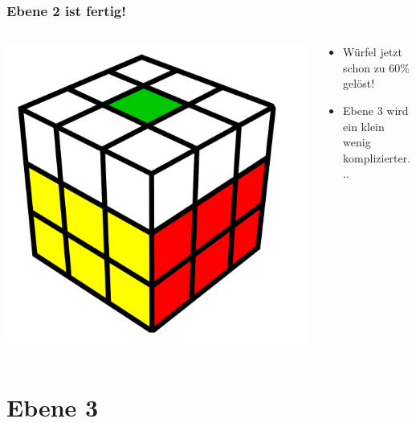 \begin{frame}
	\frametitle{Ebene 2 ist fertig!}
	
	\begin{columns}[c]
		\begin{column}[C]{.5\textwidth}
			\center
			\includegraphics[scale=0.3]{img/layer2edge4}
		\end{column}
		\begin{column}[C]{.5\textwidth}
			\begin{itemize}
				\item Würfel jetzt schon zu 60\% gelöst!
				\item Ebene 3 wird ein klein wenig komplizierter...
			\end{itemize}
		\end{column}
	\end{columns}
	
\end{frame}



\section{Ebene 3} %
\label{sec:ebene_3}

\subsection*{}

